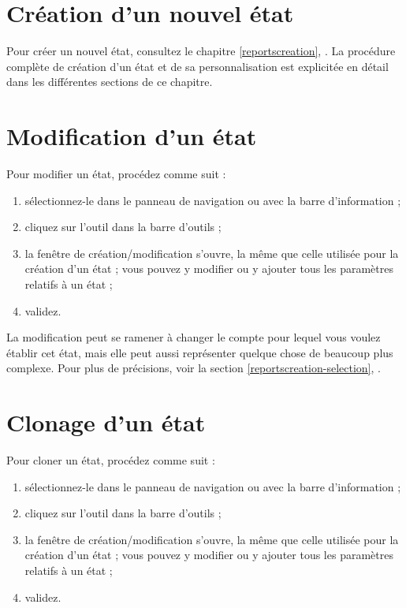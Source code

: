 \section{Création d'un nouvel état}


Pour créer un nouvel état, consultez le chapitre \vref{reportscreation}, . La procédure complète de création d'un état et de sa personnalisation est explicitée en détail dans les différentes sections de ce chapitre.


\section{Modification d'un état\label{reports-modify}}


Pour modifier un état, procédez comme suit :

\begin{enumerate}
	 \item sélectionnez-le dans le panneau de navigation ou avec la barre d'information ;
	 \item cliquez sur l'outil  dans la barre d'outils ;
	 \item la fenêtre de création/modification s'ouvre, la même que celle utilisée pour la création d'un état ; vous pouvez y modifier ou y ajouter tous les paramètres relatifs à un état ;
	 \item validez.
\end{enumerate}

La modification peut se ramener à changer le compte pour lequel vous voulez établir cet état, mais elle peut aussi représenter quelque chose de beaucoup plus complexe. Pour plus de précisions, voir la section \vref{reportscreation-selection}, .


\section{Clonage d'un état}


Pour cloner un état, procédez comme suit :

\begin{enumerate}
	 \item sélectionnez-le dans le panneau de navigation ou avec la barre d'information ;
	 \item cliquez sur l'outil  dans la barre d'outils ;
	 \item la fenêtre de création/modification s'ouvre, la même que celle utilisée pour la création d'un état ; vous pouvez y modifier ou y ajouter tous les paramètres relatifs à un état ;
	 \item validez.
\end{enumerate}

